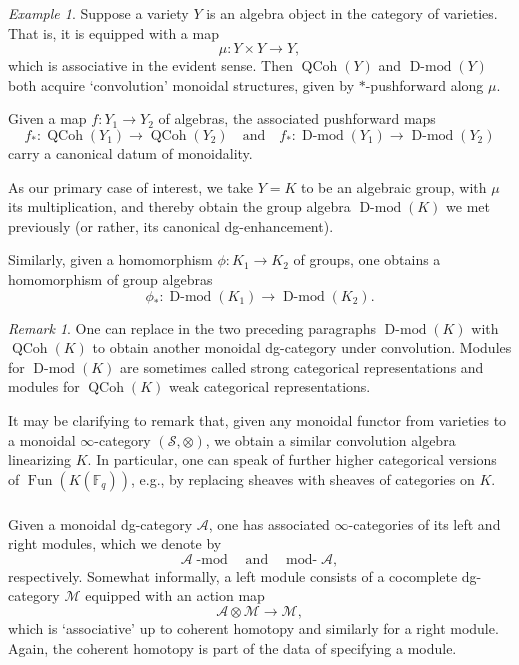 \documentclass[10pt]{amsart}
\newcommand{\sM}{\mathscr{M}}
\newcommand{\on}{\operatorname}
\renewcommand{\mod}{\on{-mod}}
\newcommand{\Dmod}{\on{D-mod}}
\newcommand{\Fq}{\mathbb{F}_q}
\newcommand{\rmod}{\on{mod-}}
\theoremstyle{remark}
\newtheorem{re}[subsubsection]{Remark}
\newtheorem{ex}[subsubsection]{Example}
\newcommand{\sA}{\mathscr{A}}
\newcommand{\sS}{\mathscr{S}}
\numberwithin{equation}{section}
\renewcommand{\mod}{\operatorname{-mod}}
\newcommand{\QCoh}{\on{QCoh}}
\begin{document}
\begin{ex} Suppose a variety $Y$ is an algebra object in the category of 
varieties. That is, it is equipped with a map 
	\[
	    \mu: Y \times Y \rightarrow Y,
	\]
which is associative in the evident sense. Then $\QCoh(Y)$ and $\Dmod(Y)$ both 
acquire `convolution' monoidal structures, given by $*$-pushforward along 
$\mu$. 


Given a map $f:Y_1 \rightarrow Y_2$ of algebras, the associated pushforward 
maps 
%
\[
 f_*: \QCoh(Y_1) \rightarrow \QCoh(Y_2) \quad \text{and} \quad f_*: \Dmod(Y_1) 
 \rightarrow \Dmod(Y_2)
\]
%
carry a canonical datum of monoidality. 

As our primary case of interest, we take $Y = K$ to be an algebraic 
group, with $\mu$ its multiplication, and thereby obtain the group algebra 
$\Dmod(K)$ we met previously (or rather, its canonical dg-enhancement).

Similarly, given a homomorphism $\phi: K_1 \rightarrow K_2$ of groups, one 
obtains a homomorphism of group algebras 
%
\[
   \phi_*: \Dmod(K_1) \rightarrow \Dmod(K_2).
\]
%
  
\end{ex}

\begin{re} One can replace in the two preceding paragraphs $\Dmod(K)$ with $\QCoh(K)$ to obtain another monoidal dg-category under convolution. Modules for $\Dmod(K)$ are sometimes called strong categorical representations and modules for $\QCoh(K)$ weak categorical representations. 

It may be clarifying to remark that, given any monoidal functor from varieties to a monoidal $\infty$-category $(\sS, \otimes)$, we obtain a similar convolution algebra linearizing $K$. In particular, one can speak of further higher categorical versions of $\on{Fun}(K(\Fq))$, e.g., by replacing sheaves with sheaves of  categories on $K$. \end{re}




\subsubsection{} Given a monoidal dg-category $\sA$, one has associated 
$\infty$-categories of its left and right modules, which we denote by 
%
\[
  \sA\mod \quad \text{and} \quad \rmod\sA,
\]
%
respectively. Somewhat informally, a left module consists of a cocomplete 
dg-category $\sM$ equipped with an action map 
%
\[
  \sA \otimes \sM \rightarrow \sM,
\]
%
which is `associative' up to coherent homotopy and similarly for a right 
module. Again, the coherent homotopy is part of the data of specifying a 
module. 
\end{document}
